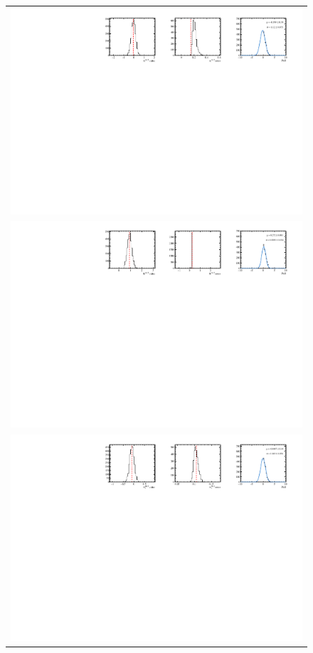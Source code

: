 \begin{figure}
  \centering
  \begin{tabular}{c}
\includegraphics[width=\textwidth]{ANA_resources/Plots/Data_fit/FitterBias//A_signal_pipi_run2.pdf} \\
\includegraphics[width=\textwidth]{ANA_resources/Plots/Data_fit/FitterBias//R_signal_pipi_run2.pdf} \\
\includegraphics[width=\textwidth]{ANA_resources/Plots/Data_fit/FitterBias//A_Bs_pipi_run2.pdf} \\

\end{tabular}
\end{figure}
